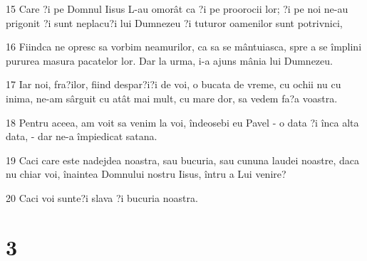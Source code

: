\par 15 Care ?i pe Domnul Iisus L-au omorât ca ?i pe proorocii lor; ?i pe noi ne-au prigonit ?i sunt neplacu?i lui Dumnezeu ?i tuturor oamenilor sunt potrivnici,
\par 16 Fiindca ne opresc sa vorbim neamurilor, ca sa se mântuiasca, spre a se împlini pururea masura pacatelor lor. Dar la urma, i-a ajuns mânia lui Dumnezeu.
\par 17 Iar noi, fra?ilor, fiind despar?i?i de voi, o bucata de vreme, cu ochii nu cu inima, ne-am sârguit cu atât mai mult, cu mare dor, sa vedem fa?a voastra.
\par 18 Pentru aceea, am voit sa venim la voi, îndeosebi eu Pavel - o data ?i înca alta data, - dar ne-a împiedicat satana.
\par 19 Caci care este nadejdea noastra, sau bucuria, sau cununa laudei noastre, daca nu chiar voi, înaintea Domnului nostru Iisus, întru a Lui venire?
\par 20 Caci voi sunte?i slava ?i bucuria noastra.

\chapter{3}

